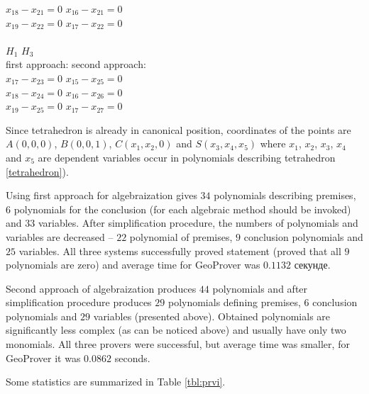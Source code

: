 \documentclass[final,1p,times,authoryear]{elsarticle}
\begin{document}
\begin{footnotesize}
\begin{tabbing}
\>\> $x_{18}  -  x_{21} = 0$ \>\>  $x_{16}  -  x_{21} = 0$ \\
\>\> $x_{19}  -  x_{22} = 0$ \>\>  $x_{17}  -  x_{22} = 0$ \\
\\
 $H_1$ $H_3$ \\
\>\> first approach: \>\> second approach: \\
\>\> $x_{17}  -  x_{23} = 0$ \>\> $x_{15}  -  x_{25} = 0$ \\
\>\> $x_{18}  -  x_{24} = 0$ \>\> $x_{16}  -  x_{26} = 0$ \\
\>\> $x_{19}  -  x_{25} = 0$ \>\> $x_{17}  -  x_{27} = 0$ \\
\end{tabbing}
\end{footnotesize}

Since tetrahedron is already in canonical position, coordinates of the
points are $A(0, 0, 0)$, $B(0, 0, 1)$, $C(x_1, x_2, 0)$ and
$S(x_3, x_4, x_5)$ where $x_1$, $x_2$, $x_3$, $x_4$ and $x_5$ are
dependent variables occur in polynomials describing tetrahedron
\ref{tetrahedron}).

Using first approach for algebraization gives $34$ polynomials
describing premises, $6$ polynomials for the conclusion (for each
algebraic method should be invoked) and $33$ variables. After
simplification procedure, the numbers of polynomials and variables are
decreased -- $22$ polynomial of premises, $9$ conclusion polynomials
and $25$ variables. All three systems successfully proved statement
(proved that all $9$ polynomials are zero) and average time for
GeoProver was $0.1132$ секунде.  

Second approach of algebraization produces $44$ polynomials and after
simplification procedure produces $29$ polynomials defining premises,
$6$ conclusion polynomials and $29$ variables (presented
above). Obtained polynomials are significantly less complex (as can be
noticed above) and usually have only two monomials. All three provers
were successful, but average time was smaller, for GeoProver it was
$0.0862$ seconds.

Some statistics are summarized in Table \ref{tbl:prvi}.
\end{document}
